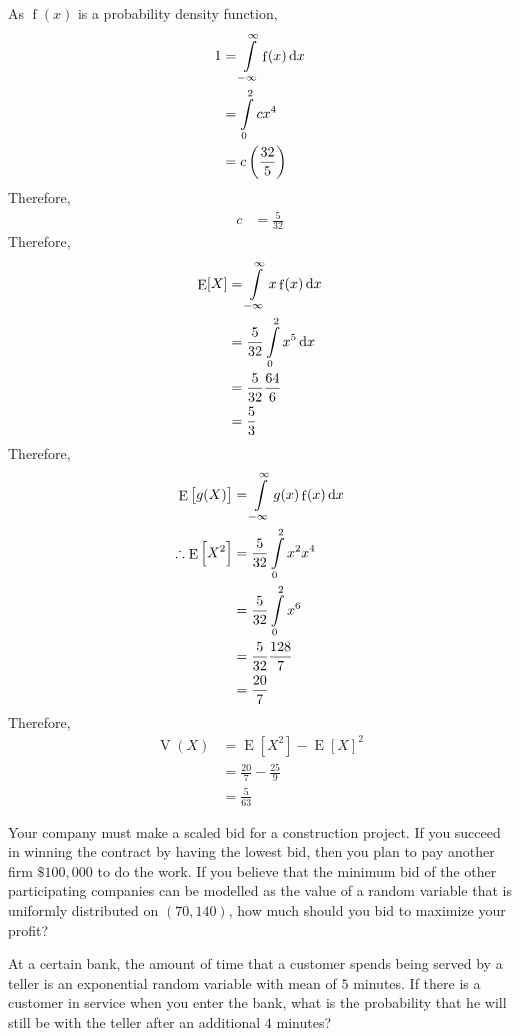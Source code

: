\documentclass[fleqn, a4paper, 11pt, oneside]{amsart}
\theoremstyle{definition}
\theoremstyle{theorem}
\DeclareMathOperator{\expct}{\mathrm{E}}
\DeclareMathOperator{\var}{\mathrm{V}}
\DeclareMathOperator{\pdf}{\mathrm{f}}
\begin{document}
\begin{solution}
	As $\pdf(x)$ is a probability density function,
	\begin{align*}
		1 &= \int\limits_{-\infty}^{\infty} \pdf(x) \dif x\\
		&= \int\limits_{0}^{2} c x^4\\
		&= c \left( \frac{32}{5} \right)
	\end{align*}
	Therefore,
	\begin{align*}
		c &= \frac{5}{32}
	\end{align*}
	Therefore,
	\begin{align*}
		\expct[X] &= \int\limits_{-\infty}^{\infty} x \pdf(x) \dif x\\
		&= \frac{5}{32} \int\limits_{0}^{2} x^5 \dif x\\
		&= \frac{5}{32} \frac{64}{6}\\
		&= \frac{5}{3}
	\end{align*}
	Therefore,
	\begin{align*}
		\expct\left[ g(X) \right] &= \int\limits_{-\infty}^{\infty} g(x) \pdf(x) \dif x\\
		\therefore \expct\left[ X^2 \right] &= \frac{5}{32} \int\limits_{0}^{2} x^2 x^4\\
		&= \frac{5}{32} \int\limits_{0}^{2} x^6\\
		&= \frac{5}{32} \frac{128}{7}\\
		&= \frac{20}{7}
	\end{align*}
	Therefore,
	\begin{align*}
		\var(X) &= \expct\left[ X^2 \right] - \expct[X]^2\\
		&= \frac{20}{7} - \frac{25}{9}\\
		&= \frac{5}{63}
	\end{align*}
\end{solution}

\begin{question}
	Your company must make a scaled bid for a construction project.
	If you succeed in winning the contract by having the lowest bid, then you plan to pay another firm $\$100,000$ to do the work.
	If you believe that the minimum bid of the other participating companies can be modelled as the value of a random variable that is uniformly distributed on $(70,140)$, how much should you bid to maximize your profit?
\end{question}

\begin{question}
	At a certain bank, the amount of time that a customer spends being served by a teller is an exponential random variable with mean of $5$ minutes.
	If there is a customer in service when you enter the bank, what is the probability that he will still be with the teller after an additional $4$ minutes?
\end{question}
\end{document}
